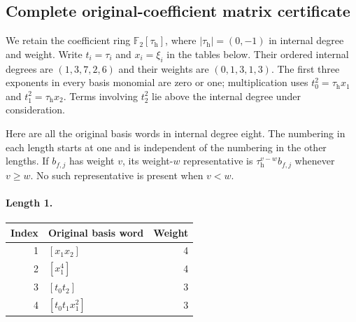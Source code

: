 \subsection{Complete original-coefficient matrix certificate}
\label{courseIII:coefficient-complete-certificate}
We retain the coefficient ring $\mathbb F_2[\tau_{\mathrm h}]$,
where $|\tau_{\mathrm h}|=(0,-1)$ in internal degree and weight.
Write $t_i=\tau_i$ and $x_i=\xi_i$ in the tables below.
Their ordered internal degrees are $(1,3,7,2,6)$ and their weights
are $(0,1,3,1,3)$. The first three exponents in every basis
monomial are zero or one; multiplication uses
$t_0^2=\tau_{\mathrm h}x_1$ and
$t_1^2=\tau_{\mathrm h}x_2$. Terms involving $t_2^2$ lie above
the internal degree under consideration.

Here are all the original basis words in internal degree eight.
The numbering in each length starts at one and is independent of
the numbering in the other lengths. If $b_{f,j}$ has weight $v$,
its weight-$w$ representative is
$\tau_{\mathrm h}^{v-w}b_{f,j}$ whenever $v\geq w$.
No such representative is present when $v<w$.

\paragraph{Length 1.}
\begin{longtable}{r l r}
Index & Original basis word & Weight\\\hline
\endhead
1 & $[x_1 x_2]$ & 4\\
2 & $[x_1^{4}]$ & 4\\
3 & $[t_0 t_2]$ & 3\\
4 & $[t_0 t_1 x_1^{2}]$ & 3\\
\end{longtable}

